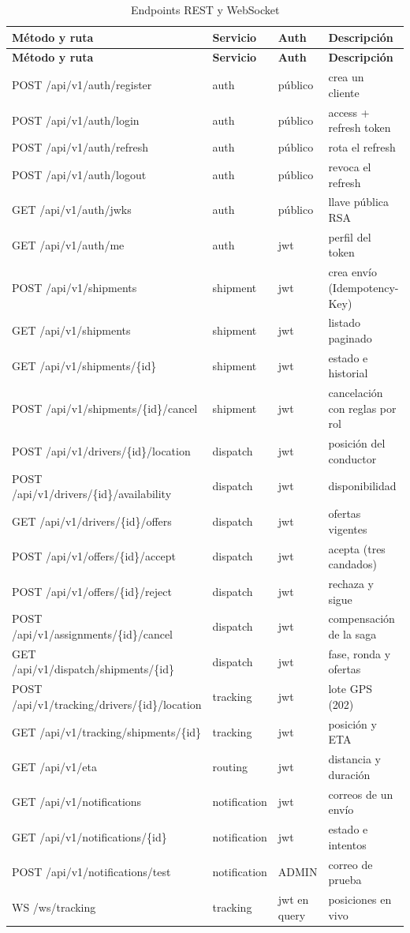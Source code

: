 \documentclass[10pt,letterpaper,twocolumn,oneside]{report}
\begin{document}
\begin{longtable}{@{}L{6.4cm}L{2.2cm}L{1.6cm}L{5.2cm}@{}}
\caption{Endpoints REST y WebSocket}\label{tab:api}\\
\toprule
\textbf{Método y ruta} & \textbf{Servicio} & \textbf{Auth} & \textbf{Descripción}\\
\midrule
\endfirsthead
\toprule
\textbf{Método y ruta} & \textbf{Servicio} & \textbf{Auth} & \textbf{Descripción}\\
\midrule
\endhead
POST /api/v1/auth/register & auth & público & crea un cliente\\
POST /api/v1/auth/login & auth & público & access + refresh token\\
POST /api/v1/auth/refresh & auth & público & rota el refresh\\
POST /api/v1/auth/logout & auth & público & revoca el refresh\\
GET /api/v1/auth/jwks & auth & público & llave pública RSA\\
GET /api/v1/auth/me & auth & jwt & perfil del token\\
POST /api/v1/shipments & shipment & jwt & crea envío (Idempotency-Key)\\
GET /api/v1/shipments & shipment & jwt & listado paginado\\
GET /api/v1/shipments/\{id\} & shipment & jwt & estado e historial\\
POST /api/v1/shipments/\{id\}/cancel & shipment & jwt & cancelación con reglas por rol\\
POST /api/v1/drivers/\{id\}/location & dispatch & jwt & posición del conductor\\
POST /api/v1/drivers/\{id\}/availability & dispatch & jwt & disponibilidad\\
GET /api/v1/drivers/\{id\}/offers & dispatch & jwt & ofertas vigentes\\
POST /api/v1/offers/\{id\}/accept & dispatch & jwt & acepta (tres candados)\\
POST /api/v1/offers/\{id\}/reject & dispatch & jwt & rechaza y sigue\\
POST /api/v1/assignments/\{id\}/cancel & dispatch & jwt & compensación de la saga\\
GET /api/v1/dispatch/shipments/\{id\} & dispatch & jwt & fase, ronda y ofertas\\
POST /api/v1/tracking/drivers/\{id\}/location & tracking & jwt & lote GPS (202)\\
GET /api/v1/tracking/shipments/\{id\} & tracking & jwt & posición y ETA\\
GET /api/v1/eta & routing & jwt & distancia y duración\\
GET /api/v1/notifications & notification & jwt & correos de un envío\\
GET /api/v1/notifications/\{id\} & notification & jwt & estado e intentos\\
POST /api/v1/notifications/test & notification & ADMIN & correo de prueba\\
WS /ws/tracking & tracking & jwt en query & posiciones en vivo\\
\bottomrule
\end{longtable}
\end{document}
